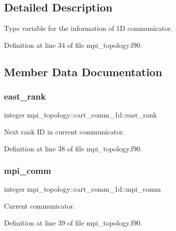 \subsection{Detailed Description}
Type variable for the information of 1D communicator. 

Definition at line 34 of file mpi\+\_\+topology.\+f90.



\subsection{Member Data Documentation}
\mbox{\label{structmpi__topology_1_1cart__comm__1d_a550b10f02ed0c5a8469174df8b54f525}} 
\subsubsection{\texorpdfstring{east\_rank}{east\_rank}}
{\footnotesize\ttfamily integer mpi\+\_\+topology\+::cart\+\_\+comm\+\_\+1d\+::east\+\_\+rank}



Next rank ID in current communicator. 



Definition at line 38 of file mpi\+\_\+topology.\+f90.

\mbox{\label{structmpi__topology_1_1cart__comm__1d_ab9d9b0c2f72db4fb74c0264691778a45}} 
\subsubsection{\texorpdfstring{mpi\_comm}{mpi\_comm}}
{\footnotesize\ttfamily integer mpi\+\_\+topology\+::cart\+\_\+comm\+\_\+1d\+::mpi\+\_\+comm}



Current communicator. 



Definition at line 39 of file mpi\+\_\+topology.\+f90.

\mbox{\label{structmpi__topology_1_1cart__comm__1d_a0b76696fcf5c27f5cfdc48e53a2671ef}} 
